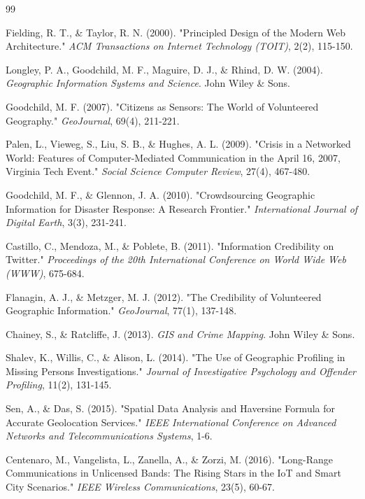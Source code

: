 \documentclass[12pt,a4paper]{report}
\begin{document}
\newpage
{}
\begin{thebibliography}{99}

Fielding, R. T., \& Taylor, R. N. (2000). "Principled Design of the Modern Web Architecture." \textit{ACM Transactions on Internet Technology (TOIT)}, 2(2), 115-150.

Longley, P. A., Goodchild, M. F., Maguire, D. J., \& Rhind, D. W. (2004). \textit{Geographic Information Systems and Science}. John Wiley \& Sons.

Goodchild, M. F. (2007). "Citizens as Sensors: The World of Volunteered Geography." \textit{GeoJournal}, 69(4), 211-221.

Palen, L., Vieweg, S., Liu, S. B., \& Hughes, A. L. (2009). "Crisis in a Networked World: Features of Computer-Mediated Communication in the April 16, 2007, Virginia Tech Event." \textit{Social Science Computer Review}, 27(4), 467-480.

Goodchild, M. F., \& Glennon, J. A. (2010). "Crowdsourcing Geographic Information for Disaster Response: A Research Frontier." \textit{International Journal of Digital Earth}, 3(3), 231-241.

Castillo, C., Mendoza, M., \& Poblete, B. (2011). "Information Credibility on Twitter." \textit{Proceedings of the 20th International Conference on World Wide Web (WWW)}, 675-684.

Flanagin, A. J., \& Metzger, M. J. (2012). "The Credibility of Volunteered Geographic Information." \textit{GeoJournal}, 77(1), 137-148.

Chainey, S., \& Ratcliffe, J. (2013). \textit{GIS and Crime Mapping}. John Wiley \& Sons.

Shalev, K., Willis, C., \& Alison, L. (2014). "The Use of Geographic Profiling in Missing Persons Investigations." \textit{Journal of Investigative Psychology and Offender Profiling}, 11(2), 131-145.

Sen, A., \& Das, S. (2015). "Spatial Data Analysis and Haversine Formula for Accurate Geolocation Services." \textit{IEEE International Conference on Advanced Networks and Telecommunications Systems}, 1-6.

Centenaro, M., Vangelista, L., Zanella, A., \& Zorzi, M. (2016). "Long-Range Communications in Unlicensed Bands: The Rising Stars in the IoT and Smart City Scenarios." \textit{IEEE Wireless Communications}, 23(5), 60-67.


\end{thebibliography}
\end{document}
